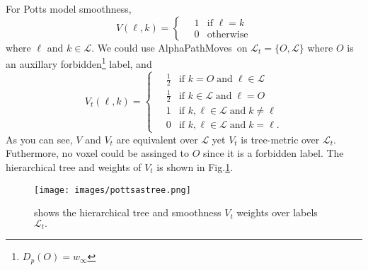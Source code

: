 \documentclass[12pt,letterpaper]{article}
\def\APM{{\ttfamily AlphaPathMoves}~}
\def\labelset{\mathcal{L}}
\def\unary{D}
\begin{document}
For Potts model smoothness,
\begin{equation*}
    V(\ell,k)=
  \begin{cases}
    \quad 1 & \mbox{if } \ell=k\\
    \quad 0 & \mbox{otherwise}
  \end{cases}
\end{equation*}
where $\ell$ and $k \in \labelset.$ We could use \APM on $\labelset_t=\{O,\labelset\}$ where $O$ is an auxillary forbidden\footnote{$\unary_p(O)=w_\infty$} label, and
\begin{equation*}
    V_t(\ell,k)=
  \begin{cases}
    \quad \frac{1}{2} & \mbox{if } k = O  \; \text{and} \; \ell \in \labelset\\
    \quad \frac{1}{2} & \mbox{if } k \in \labelset  \; \text{and} \; \ell = O\\
    \quad 1 & \mbox{if } k, \ell \in \labelset \; \text{and} \; k \not=\ell\\
    \quad 0 & \mbox{if } k, \ell \in \labelset \; \text{and} \; k = \ell.
  \end{cases}
\end{equation*}
As you can see, $V$ and $V_t$ are equivalent over $\labelset$  yet $V_t$ is tree-metric over $\labelset_t$. Futhermore, no voxel could be assinged to $O$ since it is a forbidden label.
The hierarchical tree and weights of $V_t$ is shown in Fig.\ref{fg:potts2tree}.
\begin{figure}
\centering
\texttt{[image: images/pottsastree.png]}
\caption{shows the hierarchical tree and smoothness $V_t$ weights over labels $\labelset_t.$}
\label{fg:potts2tree}
\end{figure}


\end{document}

